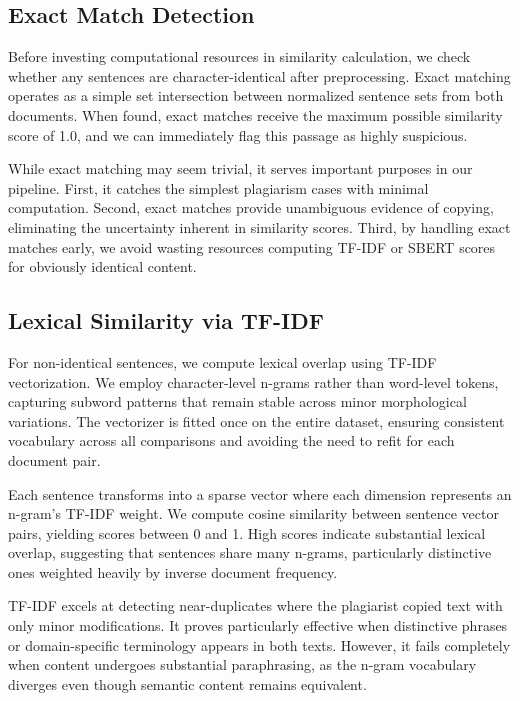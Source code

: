 \documentclass[conference]{IEEEtran}
\begin{document}
\subsection{Exact Match Detection}

Before investing computational resources in similarity calculation, we check whether any sentences are character-identical after preprocessing. Exact matching operates as a simple set intersection between normalized sentence sets from both documents. When found, exact matches receive the maximum possible similarity score of 1.0, and we can immediately flag this passage as highly suspicious.

While exact matching may seem trivial, it serves important purposes in our pipeline. First, it catches the simplest plagiarism cases with minimal computation. Second, exact matches provide unambiguous evidence of copying, eliminating the uncertainty inherent in similarity scores. Third, by handling exact matches early, we avoid wasting resources computing TF-IDF or SBERT scores for obviously identical content.

\subsection{Lexical Similarity via TF-IDF}

For non-identical sentences, we compute lexical overlap using TF-IDF vectorization. We employ character-level n-grams rather than word-level tokens, capturing subword patterns that remain stable across minor morphological variations. The vectorizer is fitted once on the entire dataset, ensuring consistent vocabulary across all comparisons and avoiding the need to refit for each document pair.

Each sentence transforms into a sparse vector where each dimension represents an n-gram's TF-IDF weight. We compute cosine similarity between sentence vector pairs, yielding scores between 0 and 1. High scores indicate substantial lexical overlap, suggesting that sentences share many n-grams, particularly distinctive ones weighted heavily by inverse document frequency.

TF-IDF excels at detecting near-duplicates where the plagiarist copied text with only minor modifications. It proves particularly effective when distinctive phrases or domain-specific terminology appears in both texts. However, it fails completely when content undergoes substantial paraphrasing, as the n-gram vocabulary diverges even though semantic content remains equivalent.
\end{document}
